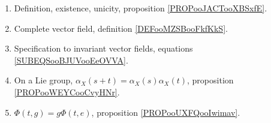 
\begin{enumerate}
    \item
        Definition, existence, unicity, proposition \ref{PROPooJACTooXBSxfE}.
    \item
        Complete vector field, definition \ref{DEFooMZSBooFkfKkS}.
    \item
        Specification to invariant vector fields, equations \eqref{SUBEQSooBJUVooEeOVVA}.
    \item
        On a Lie group, \( \alpha_X(s+t)=\alpha_X(s)\alpha_X(t)\), proposition \ref{PROPooWEYCooCvyHNr}.
    \item
        \( \Phi(t,g)=g\Phi(t,e)\), proposition \ref{PROPooUXFQooIwimav}.
\end{enumerate}

